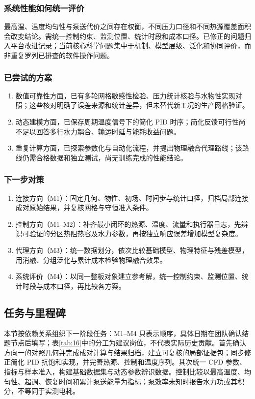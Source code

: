 \documentclass[UTF8]{midterm}
\begin{document}
\subsubsection{系统性能如何统一评价}
最高温、温度均匀性与泵送代价之间存在权衡，不同压力口径和不同热源覆盖面积会改变结论。需统一控制约束、监测位置、统计时段和成本口径。已修正的问题归入平台改进记录；当前核心科学问题集中于机制、模型层级、泛化和协同评价，而非重复罗列已排查的软件操作问题。

\subsubsection{已尝试的方案}
\begin{enumerate}
\item 数值可靠性方面，已有多轮网格敏感性检验、压力统计核验与水物性实现对照；这些核对明确了误差来源和统计差异，但未替代新工况的生产网格验证。
\item 动态建模方面，已保存周期温度信号下的简化 PID 时序；简化反馈可行性尚不足以回答多行水力耦合、输运时延与能耗收益问题。
\item 重复计算方面，已探索参数化与自动化流程，并提出物理融合代理路线；该路线仍需合格数据和独立测试，尚无训练完成的性能结论。
\end{enumerate}
\subsubsection{下一步对策}
\begin{enumerate}
\item 连接方向（M1）：固定几何、物性、初场、时间步与统计口径，归档局部连接成对原始结果，并复核网格与守恒准入条件。
\item 控制方向（M1--M2）：补齐最小闭环的热源、温度、流量和执行器日志，先辨识可验证的分区热阻热容及水力参数，再按独立响应误差增加模型复杂度。
\item 代理方向（M3）：统一数据划分，依次比较基础模型、物理特征与残差模型，用消融、分组泛化与累计成本检验物理融合效果。
\item 系统评价（M4）：以同一整板对象建立参考解，统一控制约束、监测位置、统计时段与成本口径，再比较各方案。
\end{enumerate}

\subsection{任务与里程碑}
本节按依赖关系组织下一阶段任务：M1--M4 只表示顺序，具体日期在团队确认结题节点后填写；表\ref{tab:16}中的分工为建议岗位，不代表实际历史贡献。首先确认方向一的对照几何并完成成对计算与结果归档，建立可复核的局部证据包；同步修正简化 PID 抗饱和实现，并完善热源、控制和温度序列。其次统一 CFD 参数、指标与样本准入，构建基础数据集与动态参数辨识数据。控制比较以最高温度、均匀性、超调、恢复时间和累计泵送能量为指标；泵效率未知时报告水力功或其积分，不等同于实测电耗。
\begingroup\small
\setlength{\tabcolsep}{4pt}
\end{document}
